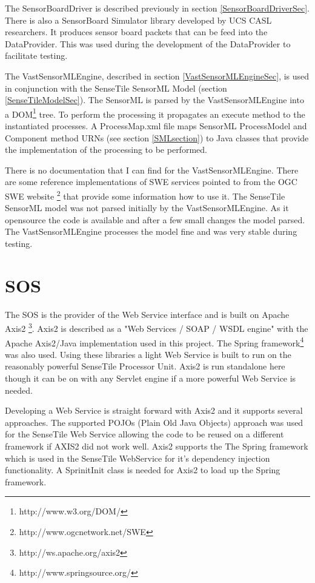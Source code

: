 \documentclass[]{final_report}
\begin{document}
The SensorBoardDriver is described previously in section \ref{SensorBoardDriverSec}. There is also a SensorBoard Simulator library developed by UCS CASL researchers. It produces sensor board packets that can be feed into the DataProvider. This was used during the development of the DataProvider to facilitate testing. 

The VastSensorMLEngine, described in section \ref{VastSensorMLEngineSec}, is used in conjunction with the SenseTile SensorML Model (section \ref{SenseTileModelSec}). The SensorML is parsed by the VastSensorMLEngine into a DOM\footnote{http://www.w3.org/DOM/} tree. To perform the processing it propagates an execute method to the instantiated processes. A ProcessMap.xml file maps SensorML ProcessModel and Component method  URNs  (see section \ref{SMLsection}) to Java classes that provide the implementation of the processing to be performed. 

There is no documentation that I can find for the VastSensorMLEngine. There are some reference implementations of SWE services pointed to from the OGC SWE website \footnote{http://www.ogcnetwork.net/SWE} that provide some information how to use it. The SenseTile SensorML model was not parsed initially by the VastSensorMLEngine. As it opensource the code is available and after a few small changes the model parsed. The VastSensorMLEngine processes the model fine and was very stable during testing.


\section{SOS}
The SOS is the provider of the Web Service interface and is built on Apache Axis2 \footnote{http://ws.apache.org/axis2}. 
Axis2 is described as a "Web Services / SOAP / WSDL engine"  with the Apache Axis2/Java implementation used in this project. The Spring framework\footnote{http://www.springsource.org/} was also used. Using these libraries a light Web Service is built to run on the reasonably powerful SenseTile Processor Unit. Axis2 is run standalone here though it can be on with any Servlet engine if a more powerful Web Service is needed.

Developing a Web Service is straight forward with Axis2 and it supports several approaches. The supported POJOs (Plain Old Java Objects) approach was used for the SenseTile Web Service allowing the code to be reused on a different framework if AXIS2 did not work well. Axis2 supports the The Spring framework which is used in the SenseTile WebService for it's dependency injection functionality. A SprinitInit class is needed for Axis2 to load up the Spring framework.
\end{document}
